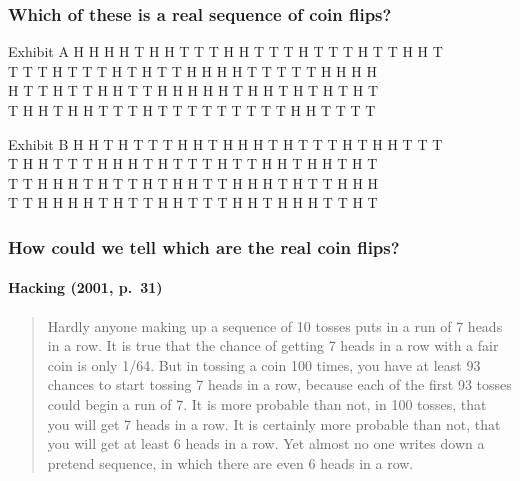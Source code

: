 \documentclass[handout]{beamer}
\begin{document}
\begin{frame}[fragile]
\frametitle{Which of these is a real sequence of coin flips?}
\small
\begin{block}{Exhibit A}
H H H H T H H T T T H H T T T H T T T H T T H H T \\
T T T H T T T H T H T T H H H H T T T T T H H H H \\
H T T H T T H H T T H H H H H T H H T H T H T H T \\
T H H T H H T T T H T T T T T T T T T H H T T T T 
\end{block}

\begin{block}{Exhibit B}
H H T H T T T H H T H H H T H T T T H T H H T T T\\
T H H T T T H H H T H T T T H T T H H T H H T H T\\
T T H H H T H T T H T H H T	T H H H T H T T H H H\\
T T H H H H T H T T H H T T T H H T H H H T T H T
\end{block}
\end{frame}
\begin{frame}
\frametitle{How could we tell which are the real coin flips?}
\framesubtitle{Hacking (2001, p.\ 31)}
	\begin{quote}
    Hardly anyone making up a sequence of 10 tosses puts in a run of 7 heads in a row. It is true that the chance of getting 7 heads in a row with a fair coin is only 1/64. But in tossing a coin 100 times, you have at least 93 chances to start tossing 7 heads in a row, because \alert{each of the first 93 tosses could begin a run of 7.} It is more probable than not, in 100 tosses, that you will get 7 heads in a row. It is certainly more probable than not, that you will get at least 6 heads in a row. Yet almost no one writes down a pretend sequence, in which there are even 6 heads in a row.
\end{quote}
\end{frame}

\end{document}
